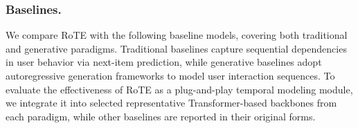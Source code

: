 \documentclass[sigconf,natbib=true]{acmart}
\begin{document}
\begin{table}[t]
    \centering
    \caption{Statistics of the Datasets.}
    \label{tab:statistics}
\end{table}


\subsubsection{Baselines.}

We compare RoTE with the following baseline models, covering both traditional and generative paradigms. 
Traditional baselines \cite{gru4rec, caser, bert4rec, sasrec} capture sequential dependencies in user behavior via next-item prediction, while generative baselines \cite{vqrec, tiger, hstu, rpg} adopt autoregressive generation frameworks to model user interaction sequences. 
To evaluate the effectiveness of RoTE as a plug-and-play temporal modeling module, we integrate it into selected representative Transformer-based backbones from each paradigm, while other baselines are reported in their original forms. 
\end{document}
